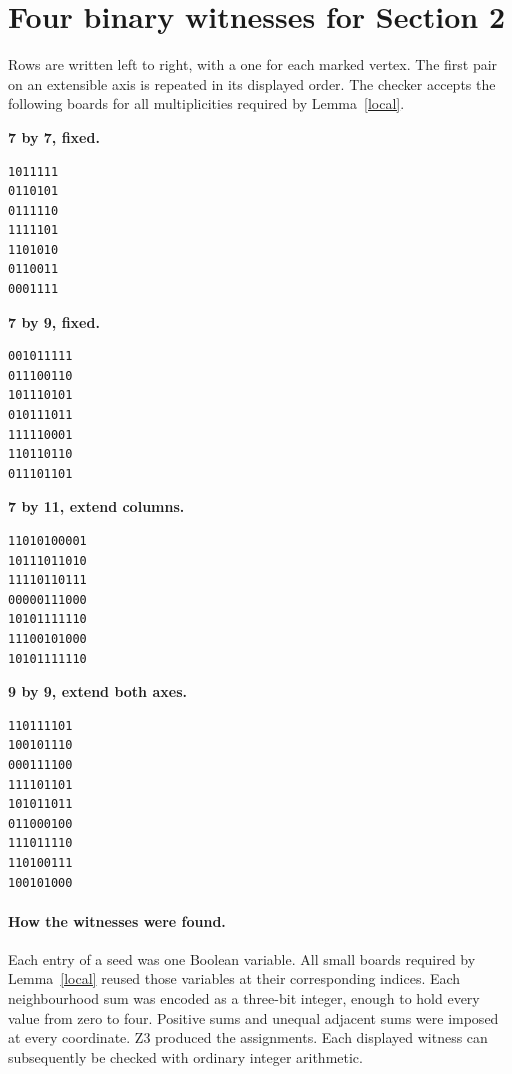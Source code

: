 \documentclass[11pt,a4paper]{article}
\begin{document}
\section{Four binary witnesses for Section 2}
Rows are written left to right, with a one for each marked vertex. The first pair on an extensible axis is repeated in its displayed order. The checker accepts the following boards for all multiplicities required by Lemma~\ref{local}.\par\medskip\noindent
\begin{minipage}[t]{0.47\linewidth}
\textbf{7 by 7, fixed.}
\begin{verbatim}
1011111
0110101
0111110
1111101
1101010
0110011
0001111
\end{verbatim}
\end{minipage}\hfill
\begin{minipage}[t]{0.47\linewidth}
\textbf{7 by 9, fixed.}
\begin{verbatim}
001011111
011100110
101110101
010111011
111110001
110110110
011101101
\end{verbatim}
\end{minipage}\par\medskip
\begin{minipage}[t]{0.47\linewidth}
\textbf{7 by 11, extend columns.}
\begin{verbatim}
11010100001
10111011010
11110110111
00000111000
10101111110
11100101000
10101111110
\end{verbatim}
\end{minipage}\hfill
\begin{minipage}[t]{0.47\linewidth}
\textbf{9 by 9, extend both axes.}
\begin{verbatim}
110111101
100101110
000111100
111101101
101011011
011000100
111011110
110100111
100101000
\end{verbatim}
\end{minipage}\par\medskip
\paragraph{How the witnesses were found.} Each entry of a seed was one Boolean variable. All small boards required by Lemma~\ref{local} reused those variables at their corresponding indices. Each neighbourhood sum was encoded as a three-bit integer, enough to hold every value from zero to four. Positive sums and unequal adjacent sums were imposed at every coordinate. Z3 produced the assignments. Each displayed witness can subsequently be checked with ordinary integer arithmetic.
\end{document}
